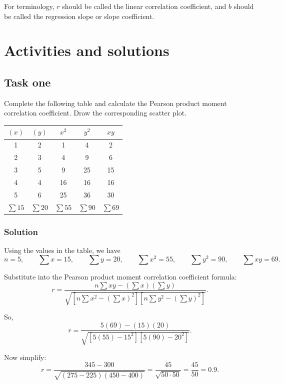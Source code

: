 \documentclass[12pt]{article}
\begin{document}
	For terminology, $r$ should be called the linear correlation coefficient, and $b$ should be called the regression slope or slope coefficient.
	
	\section{Activities and solutions}
	
	\subsection{Task one}
	
	Complete the following table and calculate the Pearson product moment correlation coefficient. Draw the corresponding scatter plot.
	
	\begin{center}
		\renewcommand{\arraystretch}{2}
		\begin{tabular}{|c|c|c|c|c|}
			\hline
			$(x)$ & $(y)$ & $x^2$ & $y^2$ & $xy$ \\ \hline
			1 & 2 & 1 & 4 & 2 \\ \hline
			2 & 3 & 4 & 9 & 6 \\ \hline
			3 & 5 & 9 & 25 & 15 \\ \hline
			4 & 4 & 16 & 16 & 16 \\ \hline
			5 & 6 & 25 & 36 & 30 \\ \hline
			$\sum 15$ & $\sum 20$ & $\sum 55$ & $\sum 90$ & $\sum 69$ \\ \hline
		\end{tabular}
	\end{center}
	
	\subsubsection*{Solution}
	
	Using the values in the table, we have
	\[
	n=5,\qquad \sum x=15,\qquad \sum y=20,\qquad \sum x^2=55,\qquad \sum y^2=90,\qquad \sum xy=69.
	\]
	
	Substitute into the Pearson product moment correlation coefficient formula:
	\[
	r=
	\frac{n\sum xy-(\sum x)(\sum y)}
	{\sqrt{\left[n\sum x^2-(\sum x)^2\right]\left[n\sum y^2-(\sum y)^2\right]}}.
	\]
	
	So,
	\[
	r=
	\frac{5(69)-(15)(20)}
	{\sqrt{\left[5(55)-15^2\right]\left[5(90)-20^2\right]}}.
	\]
	
	Now simplify:
	\[
	r=
	\frac{345-300}
	{\sqrt{(275-225)(450-400)}}
	=
	\frac{45}{\sqrt{50\cdot 50}}
	=
	\frac{45}{50}
	=0.9.
	\]
	
\end{document}
